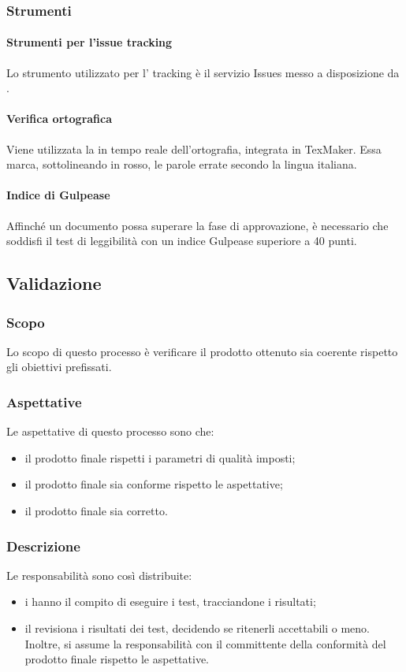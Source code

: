 \subsubsection{Strumenti}
\paragraph{Strumenti per l'issue tracking}
Lo strumento utilizzato per l' tracking è il servizio Issues messo a disposizione da .
\paragraph{Verifica ortografica}
Viene utilizzata la  in tempo reale dell'ortografia, integrata in TexMaker. Essa marca,
sottolineando in rosso, le parole errate secondo la lingua italiana.
\paragraph{Indice di Gulpease}
Affinché un documento possa superare la fase di approvazione, è necessario che soddisfi il test di leggibilità con un indice Gulpease superiore a 40 punti.
 \subsection{Validazione}
 \subsubsection{Scopo}
 Lo scopo di questo processo è verificare il prodotto ottenuto sia coerente rispetto gli obiettivi prefissati.
 \subsubsection{Aspettative}
 Le aspettative di questo processo sono che:
 \begin{itemize}
 	\item il prodotto finale rispetti i parametri di qualità imposti;
 	\item il prodotto finale sia conforme rispetto le aspettative;
 	\item il prodotto finale sia corretto.
 \end{itemize}
 \subsubsection{Descrizione}
 Le responsabilità sono così distribuite:
 \begin{itemize}
 	\item i \VERP{} hanno il compito di eseguire i test, tracciandone i risultati;
 	\item il \RESP{} revisiona i risultati dei test, decidendo se ritenerli accettabili o meno. Inoltre, si assume la responsabilità con il committente della conformità del prodotto finale rispetto le aspettative.
 \end{itemize}